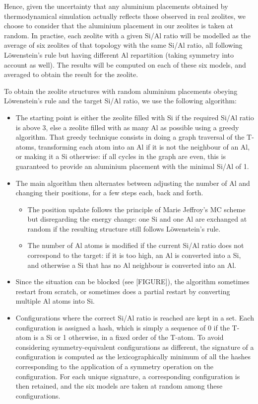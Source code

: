 \documentclass[main.tex]{subfiles}
\begin{document}
Hence, given the uncertainty that any aluminium placements obtained by thermodynamical simulation actually reflects those observed in real zeolites, we choose to consider that the aluminium placement in our zeolites is taken at random. In practise, each zeolite with a given Si/Al ratio will be modelled as the average of six zeolites of that topology with the same Si/Al ratio, all following L\"owenstein's rule but having different Al repartition (taking symmetry into account as well). The results will be computed on each of these six models, and averaged to obtain the result for the zeolite.

To obtain the zeolite structures with random aluminium placements obeying L\"owenstein's rule and the target Si/Al ratio, we use the following algorithm:
\begin{itemize}
    \item The starting point is either the zeolite filled with Si if the required Si/Al ratio is above 3, else a zeolite filled with as many Al as possible using a greedy algorithm. That greedy technique consists in doing a graph traversal of the T-atoms, transforming each atom into an Al if it is not the neighbour of an Al, or making it a Si otherwise: if all cycles in the graph are even, this is guaranteed to provide an aluminium placement with the minimal Si/Al of 1.
    \item The main algorithm then alternates between adjusting the number of Al and changing their positions, for a few steps each, back and forth.
    \begin{itemize}
        \item The position update follows the principle of Marie Jeffroy's MC scheme but disregarding the energy change: one Si and one Al are exchanged at random if the resulting structure still follows L\"owenstein's rule.
        \item The number of Al atoms is modified if the current Si/Al ratio does not correspond to the target: if it is too high, an Al is converted into a Si, and otherwise a Si that has no Al neighbour is converted into an Al.
    \end{itemize}
    \item Since the situation can be blocked (see [FIGURE]), the algorithm sometimes restart from scratch, or sometimes does a partial restart by converting multiple Al atoms into Si.
    \item Configurations where the correct Si/Al ratio is reached are kept in a set. Each configuration is assigned a hash, which is simply a sequence of 0 if the T-atom is a Si or 1 otherwise, in a fixed order of the T-atom. To avoid considering symmetry-equivalent configurations as different, the signature of a configuration is computed as the lexicographically minimum of all the hashes corresponding to the application of a symmetry operation on the configuration. For each unique signature, a corresponding configuration is then retained, and the six models are taken at random among these configurations.
\end{itemize}
\end{document}

